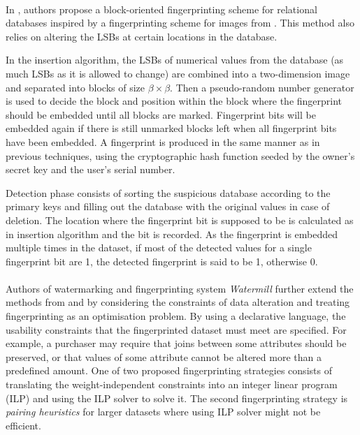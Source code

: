 \paragraph{}
In \cite{liu2004block}, authors propose a block-oriented fingerprinting scheme for relational databases inspired by a fingerprinting scheme for images from \cite{das2002robust}. 
This method also relies on altering the LSBs at certain locations in the database. 

In the insertion algorithm, the LSBs of numerical values from the database (as much LSBs as it is allowed to change) are combined into a two-dimension image and separated into blocks of size $\beta\times\beta$. 
Then a pseudo-random number generator is used to decide the block and position within the block where the fingerprint should be embedded until all blocks are marked. 
Fingerprint bits will be embedded again if there is still unmarked blocks left when all fingerprint bits have been embedded. 
A fingerprint is produced in the same manner as in previous techniques, using the cryptographic hash function seeded by the owner’s secret key and the user’s serial number.

Detection phase consists of sorting the suspicious database according to the primary keys and filling out the database with the original values in case of deletion. 
The location where the fingerprint bit is supposed to be is calculated as in insertion algorithm and the bit is recorded. 
As the fingerprint is embedded multiple times in the dataset, if most of the detected values for a single fingerprint bit are 1, the detected fingerprint is said to be 1, otherwise 0. 
\paragraph{}
Authors of watermarking and fingerprinting system \textit{Watermill} \cite{constantin2005watermill, lafaye2008watermill} further extend the methods from \cite{agrawal2003watermarking} and \cite{li2005fingerprinting} by considering the constraints of data alteration and treating fingerprinting as an optimisation problem. 
By using a declarative language, the usability constraints that the fingerprinted dataset must meet are specified. For example, a purchaser may require that joins between some attributes should be preserved, or that values of some attribute cannot be altered more than a predefined amount. 
One of two proposed fingerprinting strategies consists of translating the weight-independent constraints into an integer linear program (ILP) and using the ILP solver to solve it. 
The second fingerprinting strategy is \textit{pairing heuristics} for larger datasets where using ILP solver might not be efficient.

